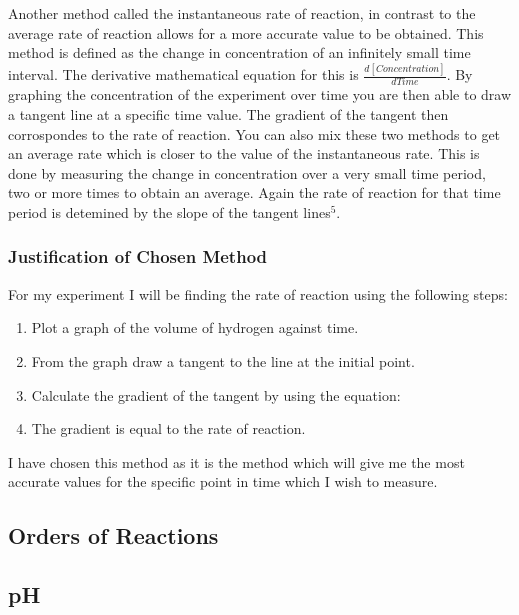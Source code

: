 Another method called the instantaneous rate of reaction, in contrast to the average rate of reaction allows for a more accurate value to be obtained. This method is defined as the change in concentration of an infinitely small time interval. The derivative mathematical equation for this is $\frac{d[Concentration]}{dTime}$. By graphing the concentration of the experiment over time you are then able to draw a tangent line at a specific time value. The gradient of the tangent then corrospondes to the rate of reaction. You can also mix these two methods to get an average rate which is closer to the value of the instantaneous rate. This is done by measuring the change in concentration over a very small time period, two or more times to obtain an average. Again the rate of reaction for that time period is detemined by the slope of the tangent lines$^5$.





		\subsubsection{Justification of Chosen Method}

For my experiment I will be finding the rate of reaction using the following steps:

\begin{enumerate}
\item Plot a graph of the volume of hydrogen against time.
\item From the graph draw a tangent to the line at the initial point.
\item Calculate the gradient of the tangent by using the equation: 
\item The gradient is equal to the rate of reaction.
\end{enumerate}

I have chosen this method as it is the method which will give me the most accurate values for the specific point in time which I wish to measure. 


	\subsection{Orders of Reactions}





	\subsection{pH}

